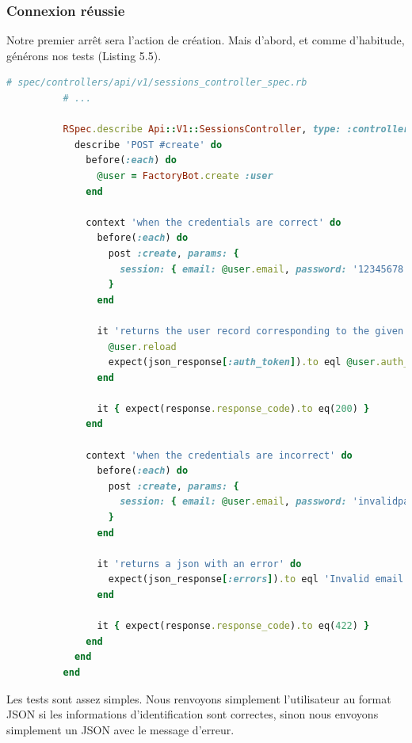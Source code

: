 \documentclass[]{report}
\begin{document}
      \subsubsection{Connexion réussie}

        Notre premier arrêt sera l'action de création. Mais d'abord, et comme d'habitude, générons nos tests (Listing 5.5).

        \begin{scriptsize}
          \begin{lstlisting}[language=ruby, caption={Création des tests du contrôlleur de sessions}, label={lst:add_sessions_controller_spec_for_create}]
          # spec/controllers/api/v1/sessions_controller_spec.rb
          # ...

          RSpec.describe Api::V1::SessionsController, type: :controller do
            describe 'POST #create' do
              before(:each) do
                @user = FactoryBot.create :user
              end

              context 'when the credentials are correct' do
                before(:each) do
                  post :create, params: {
                    session: { email: @user.email, password: '12345678' }
                  }
                end

                it 'returns the user record corresponding to the given credentials' do
                  @user.reload
                  expect(json_response[:auth_token]).to eql @user.auth_token
                end

                it { expect(response.response_code).to eq(200) }
              end

              context 'when the credentials are incorrect' do
                before(:each) do
                  post :create, params: {
                    session: { email: @user.email, password: 'invalidpassword' }
                  }
                end

                it 'returns a json with an error' do
                  expect(json_response[:errors]).to eql 'Invalid email or password'
                end

                it { expect(response.response_code).to eq(422) }
              end
            end
          end
          \end{lstlisting}
        \end{scriptsize}

        Les tests sont assez simples. Nous renvoyons simplement l'utilisateur au format JSON si les informations d'identification sont correctes, sinon nous envoyons simplement un JSON avec le message d'erreur.
\end{document}
